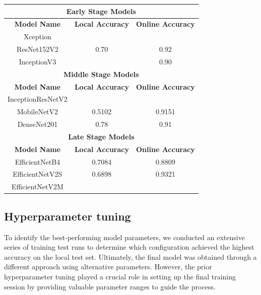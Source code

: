 \documentclass[11pt]{article}
\begin{document}
\begin{table}[h!]
    \centering
    \begin{tabular}{|c|c|c|}
        \hline
        \multicolumn{3}{|c|}{\textbf{Early Stage Models}} \\ \hline
        \textbf{Model Name} & \textbf{Local Accuracy} & \textbf{Online Accuracy} \\ \hline
        Xception            &  &  \\ \hline
        ResNet152V2         & 0.70 & 0.92 \\ \hline
        InceptionV3         &  & 0.90 \\ \hline
        \multicolumn{3}{|c|}{\textbf{Middle Stage Models}} \\ \hline
        \textbf{Model Name} & \textbf{Local Accuracy} & \textbf{Online Accuracy} \\ \hline
        InceptionResNetV2   &  &  \\ \hline
        MobileNetV2         & 0.5102 & 0.9151 \\ \hline
        DenseNet201         & 0.78 & 0.91 \\ \hline
        \multicolumn{3}{|c|}{\textbf{Late Stage Models}} \\ \hline
        \textbf{Model Name} & \textbf{Local Accuracy} & \textbf{Online Accuracy} \\ \hline
        EfficientNetB4      & 0.7084 & 0.8809 \\ \hline
        EfficientNetV2S     & 0.6898 & 0.9321 \\ \hline
        EfficientNetV2M     &  &  \\ \hline
    \end{tabular}
\end{table}

\subsection{Hyperparameter tuning}

To identify the best-performing model parameters, we conducted an extensive series of training test runs to determine which configuration achieved the highest accuracy on the local test set. 
Ultimately, the final model was obtained through a different approach using alternative parameters.
However, the prior hyperparameter tuning played a crucial role in setting up the final training session by providing valuable parameter ranges to guide the process.
\end{document}
